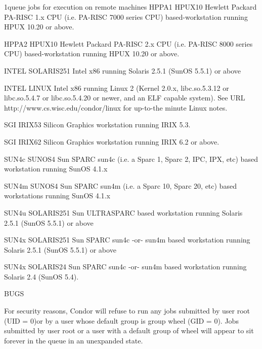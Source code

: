 \begin{ManPage}{}{1}{queue jobs for execution on remote machines}
HPPA1    HPUX10       Hewlett Packard PA-RISC 1.x CPU (i.e. PA-RISC    
                      7000 series CPU) based-workstation running HPUX  
                      10.20 or above.                                  

HPPA2    HPUX10       Hewlett Packard PA-RISC 2.x CPU (i.e. PA-RISC    
                      8000 series CPU) based-workstation running HPUX  
                      10.20 or above.                                  

INTEL    SOLARIS251   Intel x86 running Solaris 2.5.1 (SunOS 5.5.1)    
                      or above                                         

INTEL    LINUX        Intel x86 running Linux 2 (Kernel 2.0.x,         
                      libc.so.5.3.12 or libc.so.5.4.7 or               
                      libc.so.5.4.20 or newer, and an ELF capable      
                      system).  See URL                                
                      http://www.cs.wisc.edu/condor/linux for          
                      up-to-the minute Linux notes.                    

SGI      IRIX53       Silicon Graphics workstation running IRIX 5.3.   

SGI      IRIX62       Silicon Graphics workstation running IRIX 6.2    
                      or above.                                        

SUN4c    SUNOS4       Sun SPARC sun4c (i.e. a Sparc 1, Sparc 2, IPC,   
                      IPX, etc) based workstation running SunOS 4.1.x  

SUN4m    SUNOS4       Sun SPARC sun4m (i.e. a Sparc 10, Sparc 20,      
                      etc) based workstations running SunOS 4.1.x      

SUN4u    SOLARIS251   Sun ULTRASPARC based workstation running         
                      Solaris 2.5.1 (SunOS 5.5.1) or above             

SUN4x    SOLARIS251   Sun SPARC sun4c -or- sun4m based workstation     
                      running Solaris 2.5.1 (SunOS 5.5.1) or above     

SUN4x    SOLARIS24    Sun SPARC sun4c -or- sun4m based workstation     
                      running Solaris 2.4 (SunOS 5.4).





BUGS 

For security reasons, Condor will refuse to run any jobs submitted by user root (UID = 0)or by a user whose default group is
group wheel (GID = 0). Jobs submitted by user root or a user with a default group of wheel will appear to sit forever in the
queue in an unexpanded state. 


\end{ManPage}
